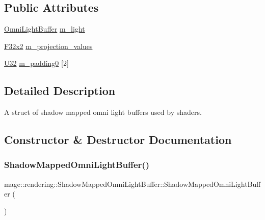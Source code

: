 \subsection*{Public Attributes}
\begin{DoxyCompactItemize}
\item 
\hyperlink{structmage_1_1rendering_1_1_omni_light_buffer}{Omni\+Light\+Buffer} \hyperlink{structmage_1_1rendering_1_1_shadow_mapped_omni_light_buffer_a6b316ed6c8b69d5aeb15fbe93c23de95}{m\+\_\+light}
\item 
\hyperlink{namespacemage_aa87237ad091f5cd7da612b8523fc108f}{F32x2} \hyperlink{structmage_1_1rendering_1_1_shadow_mapped_omni_light_buffer_a29016735134bb44c6c6f0d52fbf9ef2c}{m\+\_\+projection\+\_\+values}
\item 
\hyperlink{namespacemage_a41c104c036fba3756a74e19f793eeaa1}{U32} \hyperlink{structmage_1_1rendering_1_1_shadow_mapped_omni_light_buffer_a01a76a39534ba04a2b1fe77ae5d1522c}{m\+\_\+padding0} \mbox{[}2\mbox{]}
\end{DoxyCompactItemize}


\subsection{Detailed Description}
A struct of shadow mapped omni light buffers used by shaders. 

\subsection{Constructor \& Destructor Documentation}
\hypertarget{structmage_1_1rendering_1_1_shadow_mapped_omni_light_buffer_a3b9f6ffd582185ea739410aeeec8a446}{}\label{structmage_1_1rendering_1_1_shadow_mapped_omni_light_buffer_a3b9f6ffd582185ea739410aeeec8a446} 
\subsubsection{\texorpdfstring{Shadow\+Mapped\+Omni\+Light\+Buffer()}{ShadowMappedOmniLightBuffer()}\hspace{0.1cm}{\footnotesize\ttfamily [1/3]}}
{\footnotesize\ttfamily mage\+::rendering\+::\+Shadow\+Mapped\+Omni\+Light\+Buffer\+::\+Shadow\+Mapped\+Omni\+Light\+Buffer (\begin{DoxyParamCaption}{ }\end{DoxyParamCaption})\hspace{0.3cm}{\ttfamily [noexcept]}}


